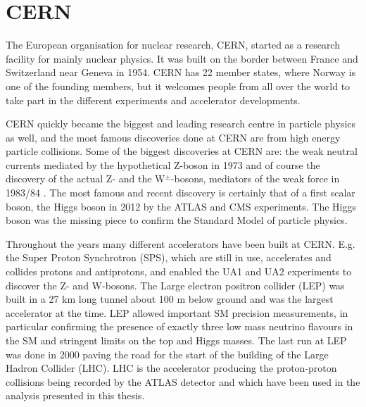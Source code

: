 \section{CERN}
\label{sec:cern}

The European organisation for nuclear research, CERN, started as a research facility for mainly nuclear physics. It was built on the border between France and Switzerland near Geneva in 1954. CERN has 22 member states, where Norway is one of the founding members, but it welcomes people from all over the world to take part in the different experiments and accelerator developments. 

CERN quickly became the biggest and leading research centre in particle physics as well, and the most famous discoveries done at CERN are from high energy particle collisions. Some of the biggest discoveries at CERN are: the weak neutral currents mediated by the hypothetical Z-boson in 1973 \cite{Zmed} and of course the discovery of the actual Z- and the W$^\pm$-bosons, mediators of the weak force in 1983/84 \cite{WZ1, WZ2, WZ3}. The most famous and recent discovery is certainly that of a first scalar boson, the Higgs boson in 2012 by the ATLAS and CMS experiments\cite{Higgs_ATLAS, Higgs_CMS}. The Higgs boson was the missing piece to confirm the Standard Model of particle physics.

Throughout the years many different accelerators have been built at CERN. E.g. the Super Proton Synchrotron (SPS), which are still in use, accelerates and collides protons and antiprotons, and enabled the UA1 and UA2 experiments to discover the Z- and W-bosons. The Large electron positron collider (LEP) was built in a 27 km long tunnel about 100 m below ground and was the largest accelerator at the time. LEP allowed important SM precision measurements, in particular confirming the presence of exactly three low mass neutrino flavours in the SM and stringent limits on the top and Higgs masses. The last run at LEP was done in 2000 paving the road for the start of the building of the Large Hadron Collider (LHC). LHC is the accelerator producing the proton-proton collisions being recorded by the ATLAS detector and which have been used in the analysis presented in this thesis. 